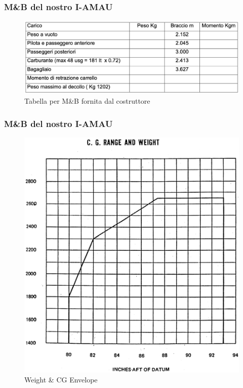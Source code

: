 \documentclass{beamer}
\begin{document}
\begin{frame}
\frametitle{M\&B del nostro I-AMAU}
\begin{figure}
\includegraphics[scale=0.4]{./images/pa28wab}
\caption{Tabella per M\&B fornita dal costruttore}
\end{figure}
\end{frame}

\begin{frame}
\frametitle{M\&B del nostro I-AMAU}
\begin{figure}
\includegraphics[scale=0.27]{./images/pa28envelope}
\caption{Weight \& CG Envelope}
\end{figure}
\end{frame}
\end{document}
